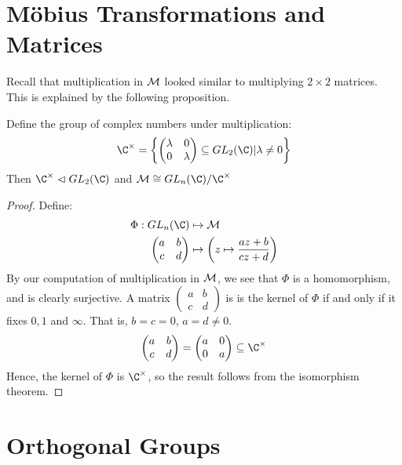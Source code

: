 \documentclass[../Main.tex]{subfiles}
\begin{document}
\section{M\"obius Transformations and Matrices}
Recall that multiplication in $\mathcal{M}$ looked similar to multiplying $2 \times 2$ matrices. This is explained by the following proposition.
\begin{proposition}
    Define the group of complex numbers under multiplication:
    \begin{equation*}
        \Ccross = \left\{
        \begin{pmatrix}
            \lambda & 0 \\
            0 & \lambda
        \end{pmatrix} \subseteq GL_2(\C) | \lambda \neq 0 \right\}
    \end{equation*}
    Then $\Ccross \normalin GL_2(\C)$ and $\mobgrp \cong GL_n(\C) / \Ccross$
\end{proposition}
\begin{proof}
    Define:
    \begin{align*}
        \Phi : GL_n(\C) &\mapsto \mobgrp \\
        \begin{pmatrix}a & b \\ c & d\end{pmatrix} &\mapsto \left(z \mapsto \frac{az + b}{cz + d}\right)
    \end{align*}
    By our computation of multiplication in $\mathcal{M}$, we see that $\Phi$ is a homomorphism, and is clearly surjective. A matrix $\begin{pmatrix} a & b \\ c & d\end{pmatrix}$ is is the kernel of $\Phi$ if and only if it fixes $0, 1$ and $\infty$. That is, $b = c = 0$, $a = d \neq 0$.
    \begin{equation*}
        \begin{pmatrix}a & b \\ c & d\end{pmatrix} = \begin{pmatrix}a & 0 \\ 0 & a\end{pmatrix} \subseteq \Ccross
    \end{equation*}
    Hence, the kernel of $\Phi$ is $\Ccross$, so the result follows from the isomorphism theorem.
\end{proof}
\section{Orthogonal Groups}
\end{document}
